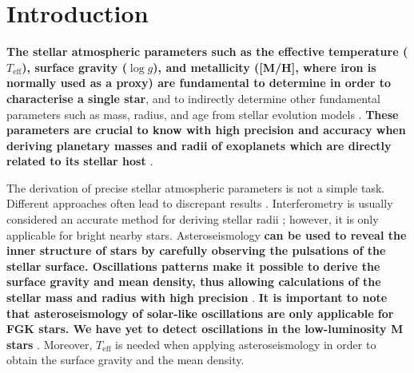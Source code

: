 \documentclass{aa}
\begin{document}
\maketitle



\section{Introduction}
\label{sec:introduction}

{\bf The stellar atmospheric parameters such as the effective temperature ($T_\mathrm{eff}$),
surface gravity ($\log g$), and metallicity ([M/H], where iron is normally used as a proxy) are
fundamental to determine in order to characterise a single star}, and to indirectly determine other
fundamental parameters such as mass, radius, and age from stellar evolution models \citep[see
e.g.][]{Girardi2000,Dotter2008,Baraffe2015}. {\bf These parameters are crucial to know with high
precision and accuracy when deriving planetary masses and radii of exoplanets which are directly
related to its stellar host} \citep[see e.g.][]{Torres2008,Ammler2009,Torres2012}.


The derivation of precise stellar atmospheric parameters is not a simple task. Different approaches
often lead to discrepant results \citep[see e.g.][]{Torres2010,Lebzelter2012b,Santos13}.
Interferometry is usually considered an accurate method for deriving stellar radii \citep[see
e.g.][]{Boyajian2012}; however, it is only applicable for bright nearby stars. Asteroseismology {\bf
can be used to reveal the inner structure of stars by carefully observing the pulsations of the
stellar surface. Oscillations patterns make it possible to derive the surface gravity and mean
density, thus allowing calculations of the stellar mass and radius with high precision} \citep[see
e.g.][for scaling relation of dwarf stars]{Kjeldsen1995}. {\bf It is important to note that
asteroseismology of solar-like oscillations are only applicable for FGK stars. We have yet to detect
oscillations in the low-luminosity M stars} \citep{Rodriguez2016,Berdinas2017}. Moreover,
$T_\mathrm{eff}$ is needed when applying asteroseismology in order to obtain the surface gravity and
the mean density.
\end{document}

